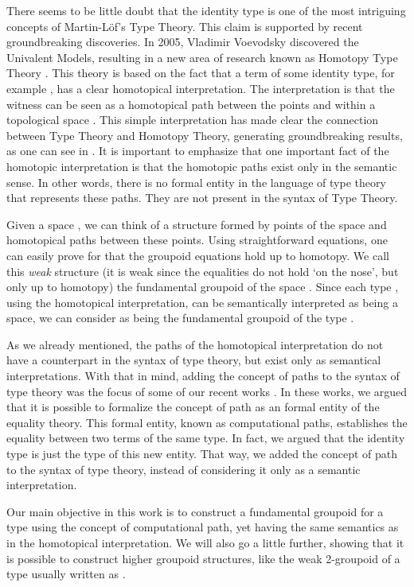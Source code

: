 \documentclass[12pt, a4paper,  oneside, headinclude,footinclude, BCOR5mm]{scrartcl}
\begin{document}
There seems to be little doubt that the identity type is one of the most intriguing concepts of  Martin-L\"of's Type Theory. This claim is supported by recent groundbreaking discoveries. In 2005, Vladimir Voevodsky \cite{Vlad1} discovered the Univalent Models, resulting in a new area of research known as Homotopy Type Theory \cite{Steve1}. This theory is based on the fact that a term of some identity type, for example , has a clear homotopical interpretation. The interpretation is that the witness  can be seen as a homotopical path between the points  and  within a topological space . This simple interpretation has made clear the connection between Type Theory and Homotopy Theory, generating groundbreaking results, as one can see in \cite{hott,Steve1}. It is important to emphasize that one important fact of the homotopic interpretation is that the homotopic paths exist only in the semantic sense. In other words, there is no formal entity in the language of type theory that represents these paths. They are not present in the syntax of Type Theory.

Given a space , we can think of a structure  formed by points of the space  and homotopical paths between these points. Using straightforward equations, one can easily prove for  that the groupoid equations hold up to homotopy. We call this \emph{weak} structure (it is weak since the equalities do not hold `on the nose', but only up to homotopy) the fundamental groupoid of the space . Since each type , using the homotopical interpretation, can be semantically interpreted as being a space, we can consider  as being the fundamental groupoid of the type .

As we already mentioned, the paths of the homotopical interpretation do not have a counterpart in the syntax of type theory, but exist only as semantical interpretations. With that in mind, adding the concept of paths to the syntax of type theory was the focus of some of our recent works \cite{Ruy1, Art1en, Ruy5}. In these works, we argued that it is possible to formalize the concept of path as an formal entity of the equality theory. This formal entity, known as computational paths, establishes the equality between two terms of the same type. In fact, we argued that the identity type is just the type of this new entity. That way, we added the concept of path to the syntax of type theory, instead of considering it only as a semantic interpretation.

Our main objective in this work is to construct a fundamental groupoid for a type  using the concept of computational path, yet having the same semantics as in the homotopical interpretation. We will also go a little further, showing that it is possible to construct higher groupoid structures, like the weak 2-groupoid of a type  usually written as .
\end{document}
